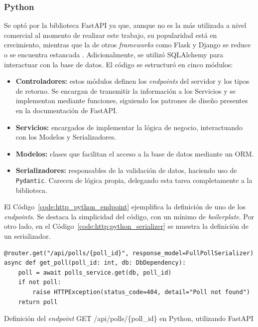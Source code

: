 \documentclass[11pt]{article}
\let\Oldsubsubsection\subsubsection
\renewcommand{\subsubsection}{\FloatBarrier\Oldsubsubsection}
\newcommand{\english}[1]{\textit{#1}}
\begin{document}
\subsubsection{Python}

Se optó por la biblioteca FastAPI ya que, aunque no es la más utilizada a nivel comercial al momento de realizar este trabajo, su popularidad está en crecimiento, mientras que la de otros \textit{frameworks} como Flask y Django se reduce o se encuentra estancada \cite{http:python_survey}. Adicionalmente, se utilizó SQLAlchemy para interactuar con la base de datos. El código se estructuró en cinco módulos:

\begin{itemize}
    \item \textbf{Controladores:} estos módulos definen los \textit{endpoints} del servidor y los tipos de retorno. Se encargan de transmitir la información a los Servicios y se implementan mediante funciones, siguiendo los patrones de diseño presentes en la documentación de FastAPI.
    \item \textbf{Servicios:} encargados de implementar la lógica de negocio, interactuando con los Modelos y Serializadores.
    \item \textbf{Modelos:} clases que facilitan el acceso a la base de datos mediante un ORM.
    \item \textbf{Serializadores:} responsables de la validación de datos, haciendo uso de \lstinline{Pydantic}. Carecen de lógica propia, delegando esta tarea completamente a la biblioteca.
\end{itemize}

El Código~\ref{code:http_python_endpoint} ejemplifica la definición de uno de los \english{endpoints}. Se destaca la simplicidad del código, con un mínimo de \english{boilerplate}. Por otro lado, en el Código~\ref{code:http:python_serializer} se muestra la definición de un serializador.

\begin{listing}[h]
\begin{verbatim}
@router.get("/api/polls/{poll_id}", response_model=FullPollSerializer)
async def get_poll(poll_id: int, db: DbDependency):
    poll = await polls_service.get(db, poll_id)
    if not poll:
        raise HTTPException(status_code=404, detail="Poll not found")
    return poll
\end{verbatim}
\caption{Definición del \english{endpoint} GET /api/polls/\{poll\_id\} en Python, utilizando FastAPI}
\label{code:http_python_endpoint}
\end{listing}
\end{document}
